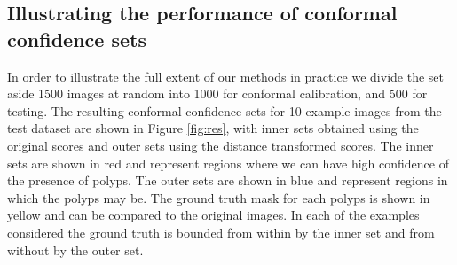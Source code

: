 \subsection{Illustrating the performance of conformal confidence sets}\label{SS:val}
In order to illustrate the full extent of our methods in practice we divide the set aside 1500 images at random into 1000 for conformal calibration, and 500 for testing. The resulting conformal confidence sets for 10 example images from the test dataset are shown in Figure \ref{fig:res}, with inner sets obtained using the original scores and outer sets using the distance transformed scores. The inner sets are shown in red and represent regions where we can have high confidence of the presence of polyps. The outer sets are shown in blue and represent regions in which the polyps may be. The ground truth mask for each polyps is shown in yellow and can be compared to the original images. In each of the examples considered the ground truth is bounded from within by the inner set and from without by the outer set. 
